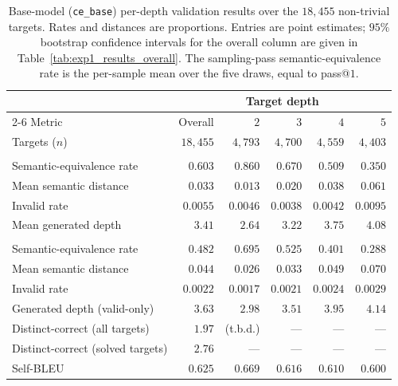 \documentclass[titlepage,a4paper,11pt]{report}
\begin{document}
    \begin{table}[ht]
        \centering
        \caption{Base-model (\texttt{ce\_base}) per-depth validation results over the $18{,}455$ non-trivial targets. Rates and distances are proportions. Entries are point estimates; $95\%$ bootstrap confidence intervals for the overall column are given in Table~\ref{tab:exp1_results_overall}. The sampling-pass semantic-equivalence rate is the per-sample mean over the five draws, equal to \textup{pass}@$1$.}
        \label{tab:exp1_results_by_depth}
        \begin{tabular}{lrrrrr}
            \toprule
            & \multicolumn{5}{c}{Target depth} \\
            \cmidrule(l){2-6}
            Metric & Overall & $2$ & $3$ & $4$ & $5$ \\
            \midrule
            Targets ($n$) & $18{,}455$ & $4{,}793$ & $4{,}700$ & $4{,}559$ & $4{,}403$ \\
            \addlinespace
            \multicolumn{6}{l}{\emph{Greedy pass}} \\
            \quad Semantic-equivalence rate & $0.603$ & $0.860$ & $0.670$ & $0.509$ & $0.350$ \\
            \quad Mean semantic distance    & $0.033$ & $0.013$ & $0.020$ & $0.038$ & $0.061$ \\
            \quad Invalid rate              & $0.0055$ & $0.0046$ & $0.0038$ & $0.0042$ & $0.0095$ \\
            \quad Mean generated depth      & $3.41$ & $2.64$ & $3.22$ & $3.75$ & $4.08$ \\
            \addlinespace
            \multicolumn{6}{l}{\emph{Sampling pass}} \\
            \quad Semantic-equivalence rate & $0.482$ & $0.695$ & $0.525$ & $0.401$ & $0.288$ \\
            \quad Mean semantic distance    & $0.044$ & $0.026$ & $0.033$ & $0.049$ & $0.070$ \\
            \quad Invalid rate              & $0.0022$ & $0.0017$ & $0.0021$ & $0.0024$ & $0.0029$ \\
            \quad Generated depth (valid-only) & $3.63$ & $2.98$ & $3.51$ & $3.95$ & $4.14$ \\
            \quad Distinct-correct (all targets)    & $1.97$ & (t.b.d.) & --- & --- & --- \\
            \quad Distinct-correct (solved targets) & $2.76$ & --- & --- & --- & --- \\
            \quad Self-BLEU                 & $0.625$ & $0.669$ & $0.616$ & $0.610$ & $0.600$ \\
            \bottomrule
        \end{tabular}
    \end{table}
    
\end{document}
